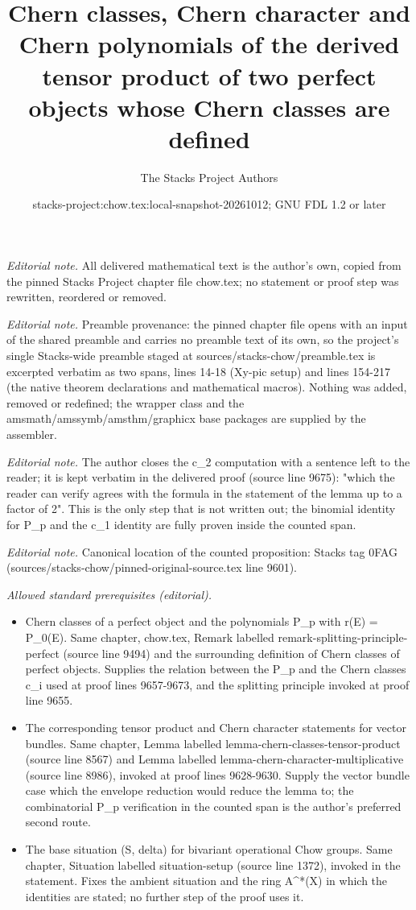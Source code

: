 \documentclass[10pt,a4paper]{amsart}
\title{Chern classes, Chern character and Chern polynomials of the derived tensor product of two perfect objects whose Chern classes are defined}
\author{The Stacks Project Authors}
\date{stacks-project:chow.tex:local-snapshot-20261012; GNU FDL 1.2 or later}
\theoremstyle{plain}
\theoremstyle{definition}
\theoremstyle{remark}
\numberwithin{equation}{subsection}
\begin{document}
\maketitle
\noindent\textit{Editorial note.} All delivered mathematical text is the author's own, copied from the pinned Stacks Project chapter file chow.tex; no statement or proof step was rewritten, reordered or removed.\par\medskip
\noindent\textit{Editorial note.} Preamble provenance: the pinned chapter file opens with an input of the shared preamble and carries no preamble text of its own, so the project's single Stacks-wide preamble staged at sources/stacks-chow/preamble.tex is excerpted verbatim as two spans, lines 14-18 (Xy-pic setup) and lines 154-217 (the native theorem declarations and mathematical macros). Nothing was added, removed or redefined; the wrapper class and the amsmath/amssymb/amsthm/graphicx base packages are supplied by the assembler.\par\medskip
\noindent\textit{Editorial note.} The author closes the c\_2 computation with a sentence left to the reader; it is kept verbatim in the delivered proof (source line 9675): "which the reader can verify agrees with the formula in the statement of the lemma up to a factor of 2". This is the only step that is not written out; the binomial identity for P\_p and the c\_1 identity are fully proven inside the counted span.\par\medskip
\noindent\textit{Editorial note.} Canonical location of the counted proposition: Stacks tag 0FAG (sources/stacks-chow/pinned-original-source.tex line 9601).\par\medskip
\noindent\textit{Allowed standard prerequisites (editorial).}\begin{itemize}
\item Chern classes of a perfect object and the polynomials P\_p with r(E) = P\_0(E). Same chapter, chow.tex, Remark labelled remark-splitting-principle-perfect (source line 9494) and the surrounding definition of Chern classes of perfect objects. Supplies the relation between the P\_p and the Chern classes c\_i used at proof lines 9657-9673, and the splitting principle invoked at proof line 9655.
\item The corresponding tensor product and Chern character statements for vector bundles. Same chapter, Lemma labelled lemma-chern-classes-tensor-product (source line 8567) and Lemma labelled lemma-chern-character-multiplicative (source line 8986), invoked at proof lines 9628-9630. Supply the vector bundle case which the envelope reduction would reduce the lemma to; the combinatorial P\_p verification in the counted span is the author's preferred second route.
\item The base situation (S, delta) for bivariant operational Chow groups. Same chapter, Situation labelled situation-setup (source line 1372), invoked in the statement. Fixes the ambient situation and the ring A\textasciicircum{}*(X) in which the identities are stated; no further step of the proof uses it.
\end{itemize}\medskip
\end{document}
